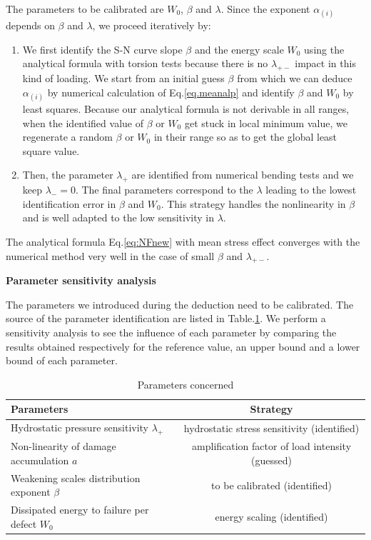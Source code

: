 \documentclass[3p,times,procedia,number]{elsarticle}
\begin{document}
The parameters to be calibrated are $W_0$, $\beta$ and $\lambda$. Since the exponent $\alpha_{(i)}$ depends on $\beta$ and $\lambda$, we proceed iteratively by:

\begin{enumerate}
	\item We first identify the S-N curve slope $\beta$ and the energy scale $W_0$ using the analytical formula with torsion tests because there is no $\lambda_{+-}$ impact in this kind of loading. We start from an initial guess $\beta$ from which we can deduce $\alpha_{(i)}$ by  numerical calculation of Eq.\ref{eq.meanalp} and identify $\beta$ and $W_0$ by least squares. Because our analytical formula is not derivable in all ranges, when the identified value of $\beta$ or $W_0$ get stuck in local minimum value, we regenerate a random $\beta$ or $W_0$ in their range so as to get the global least square value.
	\item Then, the parameter $\lambda_{+}$ are identified from numerical bending tests and we keep $\lambda_-=0$. The final parameters correspond to the $\lambda$ leading to the lowest identification error in $\beta$ and $W_0$. This strategy handles the nonlinearity in $\beta$ and is well adapted to the low sensitivity in $\lambda$.
\end{enumerate}


The analytical formula Eq.\eqref{eq:NFnew} with mean stress effect converges with the numerical method very well in the case of small $\beta$ and $\lambda_{+-}$. 


\textbf{Parameter sensitivity analysis}

The parameters we introduced during the deduction need to be calibrated. The source of the parameter identification are listed in Table.\ref{paras}.
We perform a sensitivity analysis to see the influence of each parameter by comparing the results obtained respectively for the reference value, an upper bound and a lower bound of each parameter.

\begin{table}[!h]
	\centering
	\begin{tabular}{l|c}
		\hline
		\textbf{Parameters}                                  & \multicolumn{1}{c}{\textbf{Strategy}} \\ \hline
		Hydrostatic pressure sensitivity $\lambda_+$           & hydrostatic stress sensitivity (identified)         \\
		Non-linearity of damage accumulation  $a$        & amplification factor of load intensity (guessed)     \\
		Weakening scales distribution exponent  $\beta$      & to be calibrated (identified)                   \\
		Dissipated energy to failure per defect  $W_0$ & energy scaling (identified)              \\ \hline
	\end{tabular}
	\caption{Parameters concerned}
	\label{paras}
\end{table}
\end{document}
